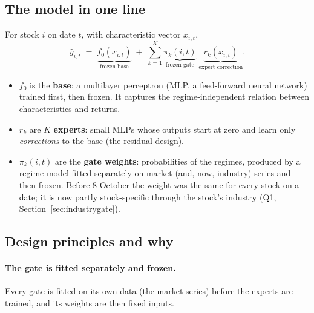\subsection{The model in one line}

For stock $i$ on date $t$, with characteristic vector $x_{i,t}$,
\begin{equation}
\hat y_{i,t} \;=\; \underbrace{f_0(x_{i,t})}_{\text{frozen base}} \;+\; \sum_{k=1}^{K}
\underbrace{\pi_k(i,t)}_{\text{frozen gate}}\;\underbrace{r_k(x_{i,t})}_{\text{expert correction}} .
\label{eq:model}
\end{equation}

\begin{itemize}
\item $f_0$ is the \textbf{base}: a multilayer perceptron (MLP, a feed-forward neural network) trained
  first, then frozen. It captures the regime-independent relation between characteristics and returns.
\item $r_k$ are $K$ \textbf{experts}: small MLPs whose outputs start at zero and learn only
  \emph{corrections} to the base (the residual design).
\item $\pi_k(i,t)$ are the \textbf{gate weights}: probabilities of the regimes, produced by a regime model
  fitted separately on market (and, now, industry) series and then frozen. Before 8 October the
  weight was the same for every stock on a date; it is now partly stock-specific through the stock's
  industry (Q1, Section~\ref{sec:industrygate}).
\end{itemize}

\subsection{Design principles and why}

\paragraph{The gate is fitted separately and frozen.}  Every gate is fitted on its own
data (the market series) before the experts are trained, and its weights are then fixed inputs.

